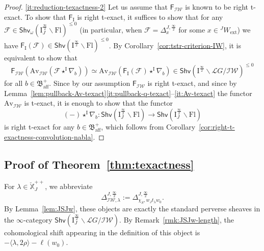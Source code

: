 \documentclass[11pt]{amsart}
\numberwithin{equation}{section}
\theoremstyle{plain}
\theoremstyle{definition}
\newcommand{\sF}{{\mathcal F}}
\newcommand{\I}{{\mathrm I}}
\newcommand{\sL}{{\mathcal L}}
\newcommand{\X}{{\mathbb X}}
\newcommand{\Xd}{\check{\X}}
\newcommand{\semi}{{{\frac{\infty}{2}}}}
\newcommand{\quar}{{{\frac{\infty}{4}}}}
\newcommand{\oblv}{\mathrm{oblv}}
\newcommand{\Av}{\mathrm{Av}}
\newcommand{\IW}{\mathcal{IW}}
\newcommand{\ex}{\mathrm{ext}}
\newcommand{\af}{\mathrm{aff}}
\newcommand{\Shv}{\mathsf{Shv}}
\newcommand{\Shvfg}{\mathsf{Shv}_{\mathrm{fg}}}
\newcommand{\Fl}{\mathrm{Fl}}
\begin{document}
\begin{proof}
\eqref{it:reduction-texactness-2}
Let us assume that $\mathsf{F}_{\IW}$ is known to be right t-exact. To show that $\mathsf{F}_{\I}$ is right t-exact,
it suffices to show that for any $\sF\in \Shv_{\omega}\left(\I_J^\semi\backslash \Fl\right)^{\leq 0}$ (in particular, when $\sF=\Delta_x^{J,\semi}$ for some $x \in {}^J W_\ex$) we have $\mathsf{F}_{\I}(\sF)\in \Shv \left(\I^\semi\backslash \Fl\right)^{\leq 0}$. 
By Corollary~\ref{cor:tstr-criterion-IW}, it is equivalent to show that 
\[
\mathsf{F}_{\IW}(\Av_\IW(\sF\star^\I \nabla_b)) \simeq \Av_\IW(\mathsf{F}_{\I}(\sF) \star^\I \nabla_b) \in \Shv\left(\I^\semi\backslash \sL{G}/\IW\right)^{\leq 0} 
\]
for all $b\in \mathfrak{B}^+_\af$.
Since by our assumption $\mathsf{F}_{\IW}$ is right t-exact, and since by Lem\-ma~\ref{lem:pullback-Av-texact}\eqref{it:pullback-q-texact}--\eqref{it:Av-texact} the functor $\Av_\IW$ is t-exact, it is enough to show that the functor 
\[
(-) \star^\I \nabla_b : \Shv\left(\I^{\semi}_J\backslash \Fl\right) \to \Shv\left(\I^{\semi}_J\backslash \Fl\right)
\]
is right t-exact for any $b \in \mathfrak{B}_\af^+$, which follows from Corollary~\ref{cor:right-t-exactness-convolution-nabla}.
\end{proof}


\subsection{Proof of Theorem~\ref{thm:texactness}} 

For $\lambda\in \Xd_J^{++}$, we abbreviate 
\[
\Delta^{J,\semi}_{\IW,\lambda}:=\Delta^{J,\semi}_{\chi_S,w_Jt_{\lambda}w_0}.
\]
By Lemma~\ref{lem:JSJw},
these objects are exactly the
standard perverse sheaves in the $\infty$-category $\Shv \left( \I^\semi_J\backslash \sL{G}/\IW \right)$. By Remark~\ref{rmk:JSJw-length}, the cohomological shift appearing in the definition of this object is $-\langle \lambda, 2\rho \rangle - \ell(w_0)$.
\end{document}
